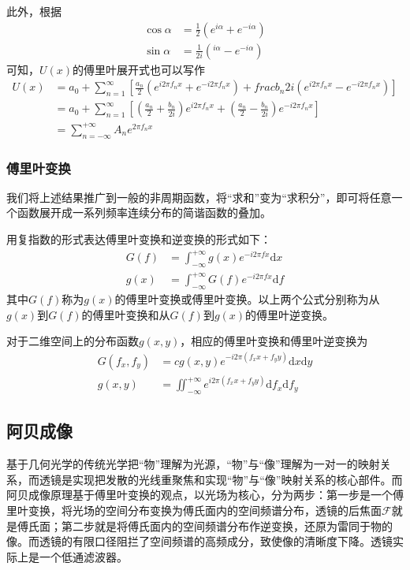 \documentclass[12pt]{article}
\begin{document}
此外，根据
\[
    \begin{aligned}
        \cos\alpha&=\frac{1}{2}(e^{i\alpha}+e^{-i\alpha}) \\
        \sin\alpha&=\frac{1}{2i}(^{i\alpha}-e^{-i\alpha})
    \end{aligned}
\]
可知，$U(x)$的傅里叶展开式也可以写作
\[
    \begin{aligned}
        U(x)&=a_0+\sum_{n=1}^{\infty}[\frac{a_n}{2}(e^{i2\pi f_nx}+e^{-i2\pi f_nx})+frac{b_n}{2i}(e^{i2\pi f_nx}-e^{-i2\pi f_nx})] \\
        &=a_0+\sum_{n=1}^{\infty}[(\frac{a_n}{2}+\frac{b_n}{2i})e^{i2\pi f_nx}+(\frac{a_n}{2}-\frac{b_n}{2i})e^{-i2\pi f_nx}] \\
        &=\sum_{n=-\infty}^{+\infty}A_ne^{2\pi f_nx}
    \end{aligned}
\]

\subsubsection{傅里叶变换}
我们将上述结果推广到一般的非周期函数，将“求和”变为“求积分”，即可将任意一个函数展开成一系列频率连续分布的简谐函数的叠加。

用复指数的形式表达傅里叶变换和逆变换的形式如下：
\[
    \begin{aligned}
        G(f)&=\int_{-\infty}^{+\infty}g(x)e^{-i2\pi fx}\mathrm{d}x \\
        g(x)&=\int_{-\infty}^{+\infty}G(f)e^{-i2\pi fx}\mathrm{d}f
    \end{aligned}
\]
其中$G(f)$称为$g(x)$的傅里叶变换或傅里叶变换。以上两个公式分别称为从$g(x)$到$G(f)$的傅里叶变换和从$G(f)$到$g(x)$的傅里叶逆变换。

对于二维空间上的分布函数$g(x,y)$，相应的傅里叶变换和傅里叶逆变换为
\[
    \begin{aligned}
        G(f_x,f_y)&=cg(x,y)e^{-i2\pi (f_xx+f_yy)}\mathrm{d}x\mathrm{d}y \\
        g(x,y)&=\iint_{-\infty}^{+\infty}e^{i2\pi (f_xx+f_yy)}\mathrm{d}f_x\mathrm{d}f_y
    \end{aligned}
\]

\subsection{阿贝成像}
基于几何光学的传统光学把“物”理解为光源，“物”与“像”理解为一对一的映射关系，而透镜是实现把发散的光线重聚焦和实现“物”与“像”映射关系的核心部件。而阿贝成像原理基于傅里叶变换的观点，以光场为核心，分为两步：第一步是一个傅里叶变换，将光场的空间分布变换为傅氏面内的空间频谱分布，透镜的后焦面$\mathscr{F}$就是傅氏面；第二步就是将傅氏面内的空间频谱分布作逆变换，还原为雷同于物的像。而透镜的有限口径阻拦了空间频谱的高频成分，致使像的清晰度下降。透镜实际上是一个低通滤波器。
\end{document}
